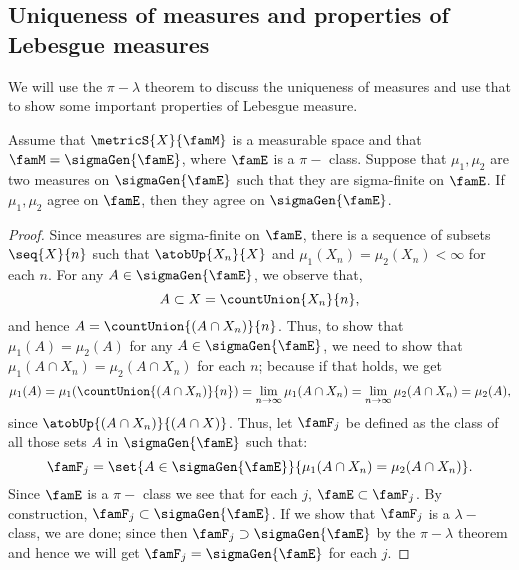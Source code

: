 \subsection{Uniqueness of measures and properties of Lebesgue measures}
We will use the $\pi-\lambda$ theorem to discuss the uniqueness of measures and use that to show some
important properties of Lebesgue measure.
\begin{Theorem}
    Assume that $\metricS{X}{\famM}$ is a measurable space and that $\famM = \sigmaGen{\famE}$, where $\famE$
    is a $\pi-$ class. Suppose that $\mu_{1},\mu_{2}$ are two measures on $\sigmaGen{\famE}$ such that they
    are sigma-finite on $\famE$. If $\mu_{1},\mu_{2}$ agree on $\famE$, then they agree on $\sigmaGen{\famE}$.
\end{Theorem}
\begin{proof}
    Since measures are sigma-finite on $\famE$, there is a sequence of subsets $\seq{X}{n}$ such that
    $\atobUp{X_n}{X}$ and $\mu_{1}(X_n) = \mu_{2}(X_n) < \infty$ for each $n$. For any $A \in
    \sigmaGen{\famE}$, we observe that,
    \[A \subset X = \countUnion{X_n}{n},\]
    and hence $A= \countUnion{(A\cap X_n)}{n}$. Thus, to show that $\mu_{1}(A) = \mu_{2}(A)$ for any $A \in
    \sigmaGen{\famE}$, we need to show that $\mu_{1}(A\cap X_n) = \mu_{2}(A\cap X_n)$ for each $n$; because if
    that holds, we get
    \[\mu_{1}(A) = \mu_{1}(\countUnion{(A\cap X_n)}{n}) = \lim\limits_{n\to\infty} \mu_1(A\cap X_n) =
	\lim\limits_{n\to\infty} \mu_2(A\cap X_n) = \mu_2(A),\]
    since $\atobUp{(A\cap X_n)}{(A\cap X)}$. 
    Thus, let $\famF_{j}$ be defined as the class of all those sets $A$ in $\sigmaGen{\famE}$ such that:
    \[\famF_{j} = \set{A\in\sigmaGen{\famE}}{\mu_1(A\cap X_n) = \mu_2(A\cap X_n)}.\]
    Since $\famE$ is a $\pi-$ class we see that for each $j$, $\famE \subset \famF_{j}$. By construction,
    $\famF_{j} \subset \sigmaGen{\famE}$. If we show that $\famF_{j}$ is a $\lambda-$ class, we are done;
    since then $\famF_{j} \supset \sigmaGen{\famE}$ by the $\pi-\lambda$ theorem and hence we will get
    $\famF_{j} = \sigmaGen{\famE}$ for each $j$.


\end{proof}
